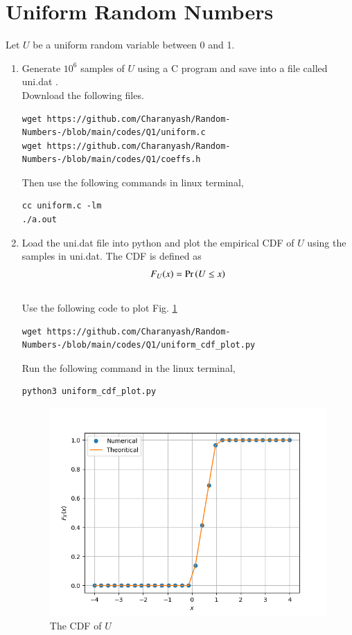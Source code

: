 \documentclass[journal,12pt,twocolumn]{IEEEtran}
\renewcommand\thesection{\arabic{section}}
\begin{document}
\section{Uniform Random Numbers}
Let $U$ be a uniform random variable between 0 and 1.
\begin{enumerate}[label=\thesection.\arabic*,ref=\thesection.\theenumi]
\item Generate $10^6$ samples of $U$ using a C program and save into a file called uni.dat .
\\
\solution Download the following files.
\begin{lstlisting}
wget https://github.com/Charanyash/Random-Numbers-/blob/main/codes/Q1/uniform.c 
wget https://github.com/Charanyash/Random-Numbers-/blob/main/codes/Q1/coeffs.h
\end{lstlisting}
Then use the following commands in linux terminal,
\begin{lstlisting}
cc uniform.c -lm
./a.out
\end{lstlisting}

%
\item
Load the uni.dat file into python and plot the empirical CDF of $U$ using the samples in uni.dat. The CDF is defined as
\begin{align}
F_{U}(x) = \Pr\left(U \le x\right)
\end{align}
\\
\solution  Use the following code to plot Fig. \ref{fig:uni_cdf}
\begin{lstlisting}
wget https://github.com/Charanyash/Random-Numbers-/blob/main/codes/Q1/uniform_cdf_plot.py
\end{lstlisting}
Run the following command in the linux terminal,
\begin{lstlisting}
python3 uniform_cdf_plot.py
\end{lstlisting}

\begin{figure}
\centering
\includegraphics[width=\columnwidth]{figs/uni_cdf.png}
\caption{The CDF of $U$}
\label{fig:uni_cdf}
\end{figure}


\end{enumerate}
\end{document}
